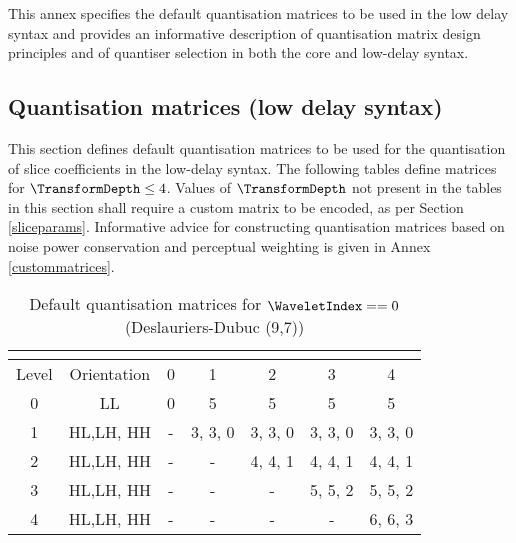 \label{quantmatrices}

This annex specifies the default quantisation matrices to be used
in the low delay syntax and provides an informative description of quantisation
matrix design principles and of quantiser selection in both the core
and low-delay syntax.

\subsection{Quantisation matrices (low delay syntax)}
\label{defaultquantmatrices}

This section defines default quantisation matrices to be used 
for the quantisation of slice coefficients in the low-delay syntax.
The following tables define matrices for $\TransformDepth\leq 4$. 
Values of $\TransformDepth$ not present in the tables
in this section shall require a custom matrix to be encoded, 
as per Section \ref{sliceparams}. Informative advice for 
constructing quantisation matrices based on noise power 
conservation and perceptual weighting is given in 
Annex \ref{custommatrices}.

\begin{table}[!ht]
\centering
\begin{tabular}{|c|c|c|c|c|c|c|}
\hline
\multicolumn{2}{|c|}{\cellcolor[gray]{0.75}}& \multicolumn{5}{|c|}{\cellcolor[gray]{0.75}{$\TransformDepth$}} \\
\hline
Level & Orientation & 0 & 1 & 2 & 3 & 4 \\
\hline
0 & LL & 0 & 5 & 5 & 5 & 5\\
\hline
1 & HL,LH, HH & - & 3, 3, 0 & 3, 3, 0 & 3, 3, 0 & 3, 3, 0  \\
\hline
2 & HL,LH, HH & - & - & 4, 4, 1 & 4, 4, 1 & 4, 4, 1  \\
\hline
3 & HL,LH, HH & - & - & - & 5, 5, 2 & 5, 5, 2  \\
\hline
4 & HL,LH, HH & - & - & - & - & 6, 6, 3  \\
\hline
\end{tabular}
\caption{Default quantisation matrices for $\WaveletIndex==0$ (Deslauriers-Dubuc (9,7)) 
\label{table:qm0}}
\end{table}

